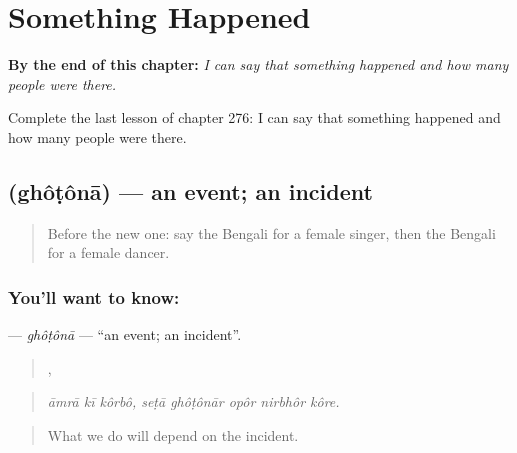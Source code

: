 
\chapter{Something Happened}
\label{ch:bn-something-happened}

\begin{chapteropening}
\textbf{By the end of this chapter:} \emph{I can say that something happened and how many people were there.}

Complete the last lesson of chapter 276: I can say that something happened and how many people were there.
\end{chapteropening}

\section[\texorpdfstring{\bn{ঘটনা} (ghôṭônā)}{ঘটনা (ghôṭônā)}]{ (ghôṭônā) — an event; an incident}

\label{lesson:BN-C276-ghotona}



\begin{quote}
Before the new one: say the Bengali for a female singer, then the Bengali for a female dancer.
\end{quote}

\subsection*{You'll want to know: }
\textbf{} — \emph{ghôṭônā} — \textquotedblleft{}an event; an incident\textquotedblright{}.

\begin{quote}
  ,     
\end{quote}

\begin{quote}
\emph{āmrā kī kôrbô, seṭā ghôṭônār opôr nirbhôr kôre.}
\end{quote}

\begin{quote}
What we do will depend on the incident.
\end{quote}

